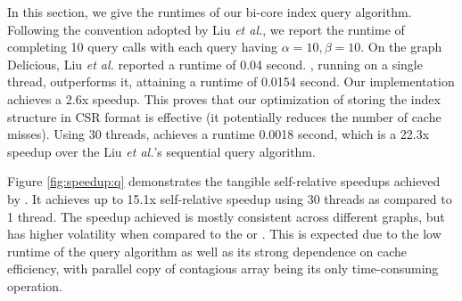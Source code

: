 In this section, we give the runtimes of our bi-core index query algorithm. Following the convention adopted by Liu \textit{et al.}, we report the runtime of completing 10 query calls with each query having $\alpha=10,\beta=10$. On the graph Delicious, Liu \textit{et al.} reported a runtime of 0.04 second. , running on a single thread, outperforms it, attaining a runtime of 0.0154 second. Our implementation achieves a 2.6x speedup. This proves that our optimization of storing the index structure in CSR format is effective (it potentially reduces the number of cache misses). Using 30 threads,  achieves a runtime 0.0018 second, which is a 22.3x speedup over the Liu \textit{et al.}'s sequential query algorithm. 


Figure \ref{fig:speedup:q} demonstrates the tangible self-relative speedups achieved by . It achieves up to 15.1x self-relative speedup using 30 threads as compared to 1 thread. The speedup achieved is mostly consistent across different graphs, but has higher volatility when compared to the  or . This is expected due to the low runtime of the query algorithm as well as its strong dependence on cache efficiency, with parallel copy of contagious array being its only time-consuming operation. 
